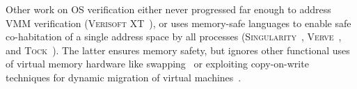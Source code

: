 Other work on OS verification either never progressed far enough to address VMM verification 
(\textsc{Verisoft XT}~\cite{cohen2009vcc,cohen2010local,dahlweid2009vcc,cohen2013SOFSEM}), or uses memory-safe languages to enable safe co-habitation 
of a single address space by all processes (\textsc{Singularity}~\cite{Fahndrich2006language,Hunt2007singularity,Hunt2007sealing,Barnett2011specsharp}, \textsc{Verve}~\cite{Yang2010Verve},
and \textsc{Tock}~\cite{levy2017multiprogramming}). The latter ensures memory safety, but ignores other functional uses of virtual memory
hardware like swapping~\cite{Denning1970VM} or exploiting copy-on-write techniques for dynamic migration of virtual machines~\cite{clark2005live}.

